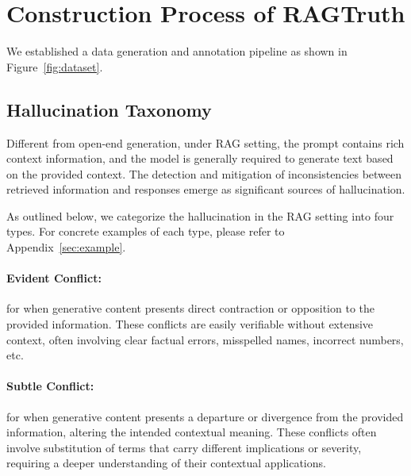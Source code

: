 \documentclass[11pt]{article}
\begin{document}
\section{Construction Process of RAGTruth}
We established a data generation and annotation pipeline as shown in Figure~\ref{fig:dataset}. 

\subsection{Hallucination Taxonomy}
Different from open-end generation, under RAG setting, the prompt contains rich context information, and the model is generally required to generate text based on the provided context. The detection and mitigation of inconsistencies between retrieved information and responses emerge as significant sources of hallucination.

As outlined below, we categorize the hallucination in the RAG setting into four types. For concrete examples of each type, please refer to Appendix~\ref{sec:example}.

\paragraph{Evident Conflict:} for when generative content presents direct contraction or opposition to the provided information. These conflicts are easily verifiable without extensive context, often involving clear factual errors, misspelled names, incorrect numbers, etc.

\paragraph{Subtle Conflict:} for when generative content presents a departure or divergence from the provided information, altering the intended contextual meaning. These conflicts often involve substitution of terms that carry different implications or severity, requiring a deeper understanding of their contextual applications. 
\end{document}
